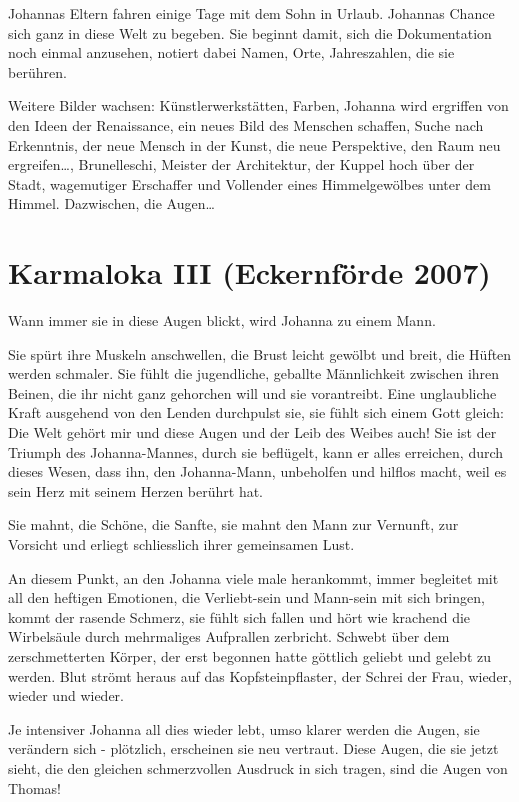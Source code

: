 \documentclass[10pt,titlepage,a5paper]{book}
\begin{document}
Johannas Eltern fahren einige Tage mit dem Sohn in Urlaub. Johannas Chance sich ganz in diese Welt zu begeben. Sie beginnt damit, sich die Dokumentation noch einmal anzusehen, notiert dabei Namen, Orte, Jahreszahlen, die sie berühren.

Weitere Bilder wachsen: Künstlerwerkstätten, Farben, Johanna wird ergriffen von den Ideen der Renaissance, ein neues Bild des Menschen schaffen, Suche  nach Erkenntnis, der neue Mensch in der Kunst, die neue Perspektive, den Raum neu ergreifen\dots , Brunelleschi, Meister der Architektur, der Kuppel hoch über der Stadt, wagemutiger Erschaffer und Vollender eines Himmelgewölbes unter dem Himmel. Dazwischen, die Augen\dots 



\section*{Karmaloka III (Eckernförde 2007)}


Wann immer sie in diese Augen blickt, wird Johanna zu einem Mann.

Sie spürt ihre Muskeln anschwellen, die Brust leicht gewölbt und breit, die Hüften werden schmaler. Sie fühlt die jugendliche, geballte Männlichkeit zwischen ihren Beinen, die ihr nicht ganz gehorchen will und sie vorantreibt. Eine unglaubliche Kraft ausgehend von den Lenden durchpulst sie, sie fühlt sich einem Gott gleich: Die Welt gehört mir und diese Augen und der Leib des Weibes auch! Sie ist der Triumph des Johanna-Mannes, durch sie beflügelt, kann er alles erreichen, durch dieses Wesen, dass ihn, den Johanna-Mann, unbeholfen und hilflos macht, weil es sein Herz mit seinem Herzen berührt hat. 

Sie mahnt, die Schöne, die Sanfte, sie mahnt den Mann zur Vernunft, zur Vorsicht und erliegt schliesslich ihrer gemeinsamen Lust.

An diesem Punkt, an den Johanna viele male herankommt, immer begleitet mit all den heftigen Emotionen, die Verliebt-sein und Mann-sein mit sich bringen, kommt der rasende Schmerz, sie fühlt sich fallen und hört wie krachend die Wirbelsäule durch mehrmaliges Aufprallen zerbricht. Schwebt  über dem zerschmetterten Körper, der erst begonnen hatte göttlich geliebt und gelebt zu werden. Blut strömt heraus auf das Kopfsteinpflaster, der Schrei der Frau, wieder, wieder und wieder.

Je intensiver Johanna all dies wieder lebt, umso klarer werden die  Augen, sie verändern sich - plötzlich, erscheinen sie neu vertraut. Diese Augen, die sie jetzt sieht, die den gleichen schmerzvollen Ausdruck in sich tragen, sind die Augen von Thomas!
\end{document}
